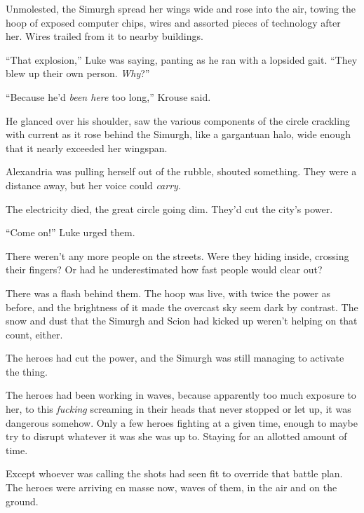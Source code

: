 Unmolested, the Simurgh spread her wings wide and rose into the air, towing the hoop of exposed computer chips, wires and assorted pieces of technology after her.  Wires trailed from it to nearby buildings.



``That explosion,'' Luke was saying, panting as he ran with a lopsided gait.  ``They blew up their own person.  \emph{Why}?''



``Because he'd \emph{been here} too long,'' Krouse said.



He glanced over his shoulder, saw the various components of the circle crackling with current as it rose behind the Simurgh, like a gargantuan halo, wide enough that it nearly exceeded her wingspan.



Alexandria was pulling herself out of the rubble, shouted something.  They were a distance away, but her voice could \emph{carry}.



The electricity died, the great circle going dim.  They'd cut the city's power.



``Come on!'' Luke urged them.



There weren't any more people on the streets.  Were they hiding inside, crossing their fingers?  Or had he underestimated how fast people would clear out?



There was a flash behind them.  The hoop was live, with twice the power as before, and the brightness of it made the overcast sky seem dark by contrast.  The snow and dust that the Simurgh and Scion had kicked up weren't helping on that count, either.



The heroes had cut the power, and the Simurgh was still managing to activate the thing.



The heroes had been working in waves, because apparently too much exposure to her, to this \emph{fucking} screaming in their heads that never stopped or let up, it was dangerous somehow.  Only a few heroes fighting at a given time, enough to maybe try to disrupt whatever it was she was up to.  Staying for an allotted amount of time.



Except whoever was calling the shots had seen fit to override that battle plan.  The heroes were arriving en masse now, waves of them, in the air and on the ground.



